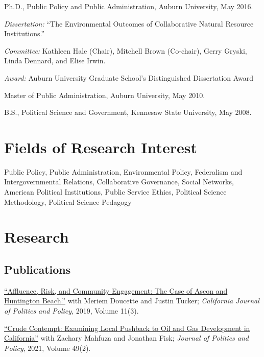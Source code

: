\documentclass[11pt,letterpaper]{article}
\renewenvironment{itemize}{
  \begin{list}{}{
    \setlength{\leftmargin}{1.5em}
    \setlength{\itemsep}{0.25em}
    \setlength{\parskip}{0pt}
    \setlength{\parsep}{0.25em}
  }
}{
  \end{list}
}
\begin{document}
\begin{itemize}
  \item Ph.D., Public Policy and Public Administration, Auburn University, May 2016.
    \begin{itemize}\leftmargin=2pt\itemindent=-15pt
    \item \emph{Dissertation:} ``The Environmental Outcomes of Collaborative Natural Resource Institutions.'' 
    \item \emph{Committee:} Kathleen Hale (Chair), Mitchell Brown (Co-chair),
	Gerry Gryski, \\Linda Dennard, and Elise Irwin.
	\item \emph{Award:} Auburn University Graduate School's Distinguished Dissertation Award
    \end{itemize}
  \item Master of Public Administration, Auburn University, May 2010.
  \item B.S., Political Science and Government, Kennesaw State University, May 2008.
\end{itemize}

\section*{Fields of Research Interest}

Public Policy, Public Administration, Environmental Policy, Federalism and Intergovernmental Relations, Collaborative Governance, Social Networks, American Political Institutions, Public Service Ethics, Political Science Methodology, Political Science Pedagogy

\section*{Research}

\subsection*{Publications}

\begin{itemize}\leftmargin=2pt\itemindent=-15pt

	\item \href{https://escholarship.org/uc/item/2mz2n6qk}{``Affluence, Risk, and Community Engagement: The Case of Ascon and Huntington Beach.''} with Meriem Doucette and Justin Tucker; \emph{California Journal of Politics and Policy}, 2019, Volume 11(3).
	
	\item \href{https://doi.org/10.1111/polp.12401}{``Crude Contempt: Examining Local Pushback to Oil and Gas Development in California''} with Zachary Mahfuza and Jonathan Fisk; \emph{Journal of Politics and Policy}, 2021, Volume 49(2).
	
\end{itemize}
\end{document}
